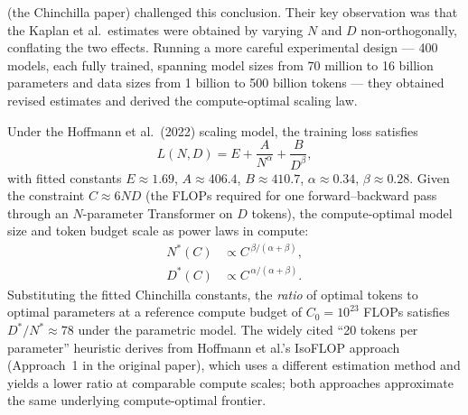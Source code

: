 \begin{deepdive}
\citet{hoffmann2022chinchilla} (the Chinchilla paper) challenged this conclusion.
Their key observation was that the Kaplan et al.\ estimates were obtained by varying
$N$ and $D$ non-orthogonally, conflating the two effects.  Running a more careful
experimental design --- 400 models, each fully trained, spanning model sizes from
70 million to 16 billion parameters and data sizes from 1 billion to 500 billion
tokens --- they obtained revised estimates and derived the compute-optimal scaling
law.

\begin{theorem}
\label{thm:chinchilla}
Under the Hoffmann et al.\ (2022) scaling model, the training loss satisfies
\begin{equation}
  L(N, D) = E + \frac{A}{N^\alpha} + \frac{B}{D^\beta},
  \label{eq:chinchilla-loss}
\end{equation}
with fitted constants $E \approx 1.69$, $A \approx 406.4$, $B \approx 410.7$,
$\alpha \approx 0.34$, $\beta \approx 0.28$.  Given the constraint $C \approx 6ND$
(the FLOPs required for one forward--backward pass through an $N$-parameter
Transformer on $D$ tokens), the compute-optimal model size and token budget scale
as power laws in compute:
\begin{align}
  N^*(C) &\propto C^{\,\beta/(\alpha+\beta)}, \label{eq:chinchilla-Nstar-scale} \\
  D^*(C) &\propto C^{\,\alpha/(\alpha+\beta)}. \label{eq:chinchilla-Dstar-scale}
\end{align}
Substituting the fitted Chinchilla constants, the \emph{ratio} of optimal tokens
to optimal parameters at a reference compute budget of $C_0 = 10^{23}$ FLOPs
satisfies $D^*/N^* \approx 78$ under the parametric model.  The widely cited
``20 tokens per parameter'' heuristic derives from Hoffmann et al.'s IsoFLOP
approach (Approach~1 in the original paper), which uses a different estimation
method and yields a lower ratio at comparable compute scales; both approaches
approximate the same underlying compute-optimal frontier.
\end{theorem}


\end{deepdive}
